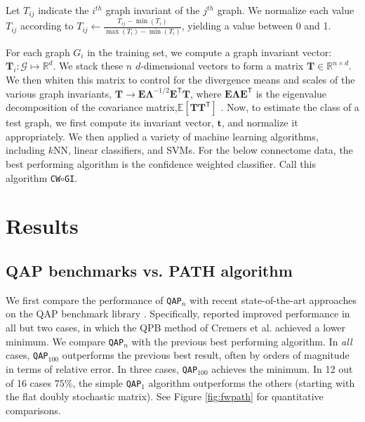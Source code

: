 \documentclass{article} %
\newcommand{\T}{^{\ensuremath{\mathsf{T}}}}           %
\newcommand{\EE}{\mathbb{E}}           %
\providecommand{\mc}[1]{\mathcal{#1}}
\providecommand{\mb}[1]{\boldsymbol{#1}}
\newcommand{\Real}{\mathbb{R}}
\newcommand{\qapa}{\texttt{QAP}$_1$ }
\newcommand{\qapn}{\texttt{QAP$_n$} }
\newcommand{\qapb}{\texttt{QAP$_{100}$} }
\begin{document}
Let $T_{ij}$ indicate the $i^{th}$ graph invariant of the $j^{th}$ graph.  We normalize each value $T_{ij}$ according to $ T_{ij} \leftarrow \frac{T_{ij} - \min(T_i)}{\max(T_i) - \min(T_i)}$,
yielding a value between 0 and 1.

For each graph $G_i$ in the training set, we compute a graph invariant vector: $\mb{T}_i: \mc{G} \mapsto \Real^d$.  We stack these $n$ $d$-dimensional vectors to form a matrix $\mb{T} \in \Real^{n \times d}$. We then whiten this matrix to control for the divergence means and scales of the various graph invariants, $\mb{T} \rightarrow \mb{E}\mb{\Lambda}^{-1/2}\mb{E}\T \mb{T}$, where $\mb{E}\mb{\Lambda}\mb{E}\T$ is the eigenvalue decomposition of the covariance matrix,$\EE[\mb{T}\mb{T}\T]$ \cite{Hyvarinen2000}.  Now, to estimate the class of a test graph, we first compute its invariant vector, $\mb{t}$, and normalize it appropriately.  We then applied a variety of machine learning algorithms, including $k$NN, linear classifiers, and SVMs.  For the below connectome data, the best performing algorithm is the confidence weighted classifier.  Call this algorithm \texttt{CW}$\circ$\texttt{GI}.




\section{Results}

\subsection{QAP benchmarks vs. PATH algorithm}

We first compare the performance of \qapn with recent state-of-the-art approaches on the QAP benchmark library \cite{Burkard1997}.  Specifically, \cite{Zaslavskiy2009} reported improved performance in all but two cases, in which the QPB method of Cremers et al. \cite{Schellewald2001} achieved a lower minimum.  We compare \qapn with the previous best performing algorithm.  In \emph{all} cases, \qapb outperforms the previous best result, often by orders of magnitude in terms of relative error. In three cases, \qapb achieves the minimum.  In 12 out of 16 cases $75\%$, the simple \qapa algorithm outperforms the others (starting with the flat doubly stochastic matrix).  See Figure \ref{fig:fwpath} for quantitative comparisons.
\end{document}
